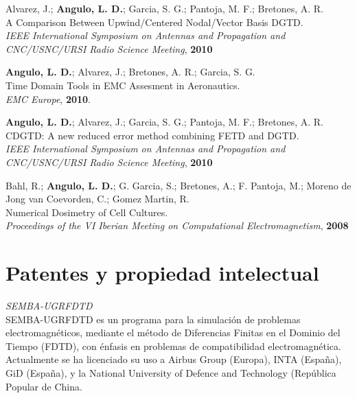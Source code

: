 \documentclass[a4paper,margin,line]{res}
\begin{document}
\begin{resume}
\begin{minipage}{\textwidth}
Alvarez, J.;  {\bf Angulo, L. D.}; Garcia, S. G.; Pantoja, M. F.; Bretones, A. R.\\
A Comparison Between Upwind/Centered Nodal/Vector Basis DGTD.\\
{\it IEEE International Symposium on Antennas and Propagation and CNC/USNC/URSI Radio Science Meeting}, {\bf 2010}
\end{minipage}

\begin{minipage}{\textwidth}
{\bf Angulo, L. D.}; Alvarez, J.; Bretones, A. R.; Garcia, S. G.\\
Time Domain Tools in EMC Assesment in Aeronautics.\\
{\it EMC Europe}, {\bf 2010}.
\end{minipage}

\begin{minipage}{\textwidth}
{\bf Angulo, L. D.}; Alvarez, J.; Garcia, S. G.; Pantoja, M. F.; Bretones, A. R.\\
CDGTD: A new reduced error method combining FETD and DGTD.\\
{\it IEEE International Symposium on Antennas and Propagation and CNC/USNC/URSI Radio Science Meeting}, {\bf 2010}
\end{minipage}

\begin{minipage}{\textwidth}
Bahl, R.;  {\bf Angulo, L. D.}; G. Garcia, S.; Bretones, A.; F. Pantoja, M.; Moreno de Jong van Coevorden, C.; Gomez Martin, R.\\
Numerical Dosimetry of Cell Cultures.\\
{\it Proceedings of the VI Iberian Meeting on Computational Electromagnetism}, {\bf 2008}
\end{minipage}

\section{\sc Patentes y propiedad intelectual}
\begin{minipage}{\textwidth}
  {\em SEMBA-UGRFDTD}\\
  SEMBA-UGRFDTD es un programa para la simulación de problemas electromagnéticos, mediante el método de Diferencias Finitas en el Dominio del Tiempo (FDTD), con énfasis en problemas de compatibilidad electromagnética. Actualmente se ha licenciado su uso a Airbus Group (Europa), INTA (España), GiD (España), y la National University of Defence and Technology (República Popular de China.
\end{minipage}


\end{resume}
\end{document}
